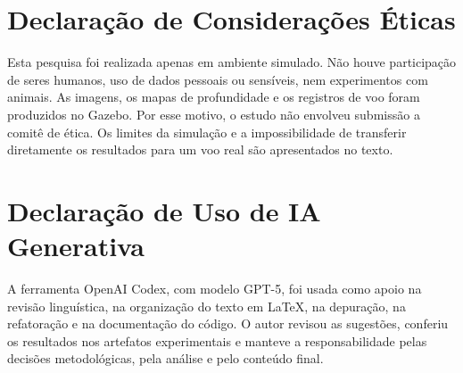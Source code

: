 \section*{Declaração de Considerações Éticas}
\thispagestyle{empty}

Esta pesquisa foi realizada apenas em ambiente simulado. Não houve participação de seres humanos, uso de dados pessoais ou sensíveis, nem experimentos com animais. As imagens, os mapas de profundidade e os registros de voo foram produzidos no Gazebo. Por esse motivo, o estudo não envolveu submissão a comitê de ética. Os limites da simulação e a impossibilidade de transferir diretamente os resultados para um voo real são apresentados no texto.

\section*{Declaração de Uso de IA Generativa}

A ferramenta OpenAI Codex, com modelo GPT-5, foi usada como apoio na revisão linguística, na organização do texto em LaTeX, na depuração, na refatoração e na documentação do código. O autor revisou as sugestões, conferiu os resultados nos artefatos experimentais e manteve a responsabilidade pelas decisões metodológicas, pela análise e pelo conteúdo final.

\clearpage
